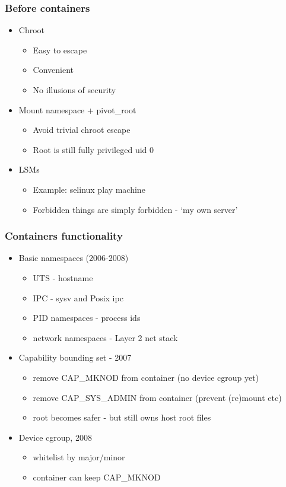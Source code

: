 \documentclass{beamer}
\begin{document}
\begin{frame}
\frametitle{Before containers}
  \begin{itemize}
    \item Chroot
      \begin{itemize}
        \item Easy to escape
        \item Convenient
        \item No illusions of security
      \end{itemize}
\pause
    \item Mount namespace + pivot\_root
  \begin{itemize}
  \item Avoid trivial chroot escape
  \item Root is still fully privileged uid 0
  \end{itemize}

\pause
    \item LSMs
      \begin{itemize}
        \item Example: selinux play machine
        \item Forbidden things are simply forbidden - `my own server'
      \end{itemize}
  \end{itemize}

\end{frame}

\begin{frame}
\frametitle{Containers functionality}
\begin{itemize}
\item Basic namespaces (2006-2008)
  \begin{itemize}
  \item UTS - hostname
  \item IPC - sysv and Posix ipc
  \item PID namespaces - process ids
  \item network namespaces - Layer 2 net stack
  \end{itemize}

\item Capability bounding set - 2007
  \begin{itemize}
    \item remove CAP\_MKNOD from container (no device cgroup yet)
    \item remove CAP\_SYS\_ADMIN from container (prevent (re)mount etc)
    \item root becomes safer - but still owns host root files
  \end{itemize}

\item Device cgroup, 2008
  \begin{itemize}
  \item whitelist by major/minor
  \item container can keep CAP\_MKNOD
  \end{itemize}
\end{itemize}
\end{frame}
\end{document}
